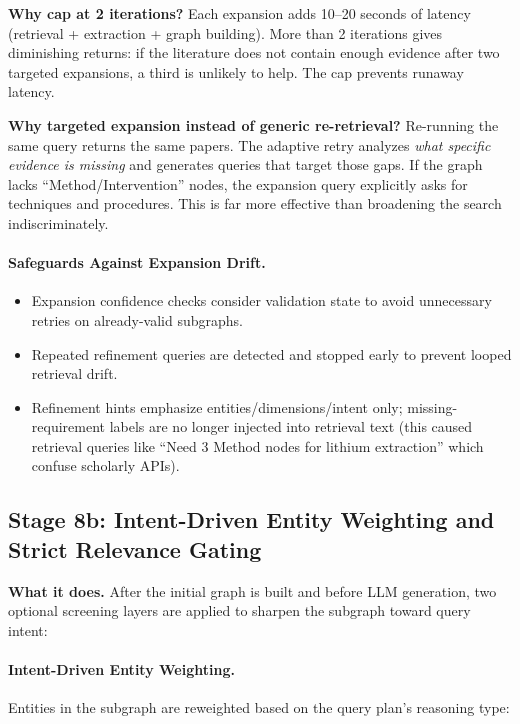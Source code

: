 \documentclass[11pt]{article}
\begin{document}
\textbf{Why cap at 2 iterations?} Each expansion adds 10--20 seconds of latency (retrieval + extraction + graph building). More than 2 iterations gives diminishing returns: if the literature does not contain enough evidence after two targeted expansions, a third is unlikely to help. The cap prevents runaway latency.

\textbf{Why targeted expansion instead of generic re-retrieval?} Re-running the same query returns the same papers. The adaptive retry analyzes \emph{what specific evidence is missing} and generates queries that target those gaps. If the graph lacks ``Method/Intervention'' nodes, the expansion query explicitly asks for techniques and procedures. This is far more effective than broadening the search indiscriminately.

\paragraph{Safeguards Against Expansion Drift.}
\begin{itemize}[leftmargin=1.2em]
  \item Expansion confidence checks consider validation state to avoid unnecessary retries on already-valid subgraphs.
  \item Repeated refinement queries are detected and stopped early to prevent looped retrieval drift.
  \item Refinement hints emphasize entities/dimensions/intent only; missing-requirement labels are no longer injected into retrieval text (this caused retrieval queries like ``Need 3 Method nodes for lithium extraction'' which confuse scholarly APIs).
\end{itemize}

\subsection{Stage 8b: Intent-Driven Entity Weighting and Strict Relevance Gating}

\textbf{What it does.} After the initial graph is built and before LLM generation, two optional screening layers are applied to sharpen the subgraph toward query intent:

\paragraph{Intent-Driven Entity Weighting.} Entities in the subgraph are reweighted based on the query plan's reasoning type:
\end{document}

